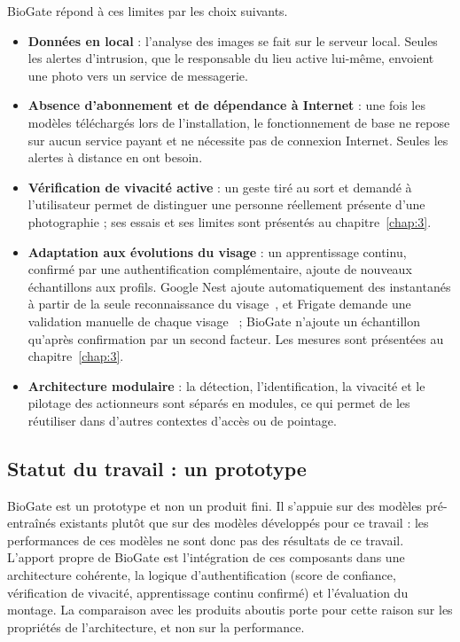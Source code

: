 BioGate répond à ces limites par les choix suivants.
\begin{itemize}
  \item \textbf{Données en local} : l'analyse des images se fait sur le serveur local. Seules les alertes d'intrusion, que le responsable du lieu active lui-même, envoient une photo vers un service de messagerie.
  \item \textbf{Absence d'abonnement et de dépendance à Internet} : une fois les modèles téléchargés lors de l'installation, le fonctionnement de base ne repose sur aucun service payant et ne nécessite pas de connexion Internet. Seules les alertes à distance en ont besoin.
  \item \textbf{Vérification de vivacité active} : un geste tiré au sort et demandé à l'utilisateur permet de distinguer une personne réellement présente d'une photographie ; ses essais et ses limites sont présentés au chapitre~\ref{chap:3}.
  \item \textbf{Adaptation aux évolutions du visage} : un apprentissage continu, confirmé par une authentification complémentaire, ajoute de nouveaux échantillons aux profils. Google Nest ajoute automatiquement des instantanés à partir de la seule reconnaissance du visage~\cite{google2026familiarface}, et Frigate demande une validation manuelle de chaque visage~\cite{frigate_face_recognition} ; BioGate n'ajoute un échantillon qu'après confirmation par un second facteur. Les mesures sont présentées au chapitre~\ref{chap:3}.
  \item \textbf{Architecture modulaire} : la détection, l'identification, la vivacité et le pilotage des actionneurs sont séparés en modules, ce qui permet de les réutiliser dans d'autres contextes d'accès ou de pointage.
\end{itemize}

\subsection{Statut du travail : un prototype}

BioGate est un prototype et non un produit fini. Il s'appuie sur des modèles pré-entraînés existants plutôt que sur des modèles développés pour ce travail : les performances de ces modèles ne sont donc pas des résultats de ce travail. L'apport propre de BioGate est l'intégration de ces composants dans une architecture cohérente, la logique d'authentification (score de confiance, vérification de vivacité, apprentissage continu confirmé) et l'évaluation du montage. La comparaison avec les produits aboutis porte pour cette raison sur les propriétés de l'architecture, et non sur la performance.

